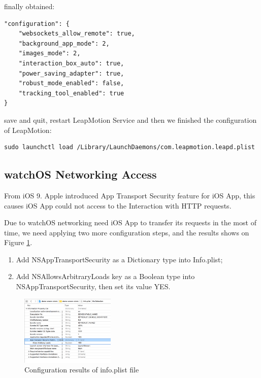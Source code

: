 finally obtained:

\begin{lstlisting}[frame=trBL,frameround=fttt,rulesepcolor=\color{white},numbers=none]
"configuration": {
    "websockets_allow_remote": true,
    "background_app_mode": 2,
    "images_mode": 2,
    "interaction_box_auto": true,
    "power_saving_adapter": true,
    "robust_mode_enabled": false,
    "tracking_tool_enabled": true
}
\end{lstlisting}

save and quit, restart LeapMotion Service and then we finished the configuration of LeapMotion:

\begin{lstlisting}[frame=trBL,frameround=fttt,rulesepcolor=\color{white},numbers=none]
sudo launchctl load /Library/LaunchDaemons/com.leapmotion.leapd.plist
\end{lstlisting}

\subsection{watchOS Networking Access}

From iOS 9. Apple introduced App Transport Security feature for iOS App, this causes iOS App could not access to the Interaction with HTTP requests.

Due to watchOS networking need iOS App to transfer its requests in the most of time, we need applying two more configuration steps, and the results shows on Figure \ref{fig:config}.

\begin{enumerate}
    \item Add NSAppTransportSecurity as a Dictionary type into Info.plist;
    \item Add NSAllowsArbitraryLoads key as a Boolean type into NSAppTransportSecurity, then set its value YES.
\end{enumerate}

\begin{figure}[H]
    \kaishu
    \centering
    \includegraphics[width=0.4\textwidth]{figures/config}
    \caption{\kaishu Configuration results of info.plist file} %
    \label{fig:config}
\end{figure}

